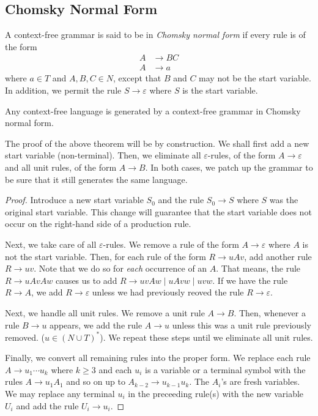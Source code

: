 \subsection{Chomsky Normal Form}
\begin{definition}
    A context-free grammar is said to be in \textit{Chomsky normal form} if every rule is of the form 
    \begin{align*}
        A &\rightarrow BC\\
        A &\rightarrow a
    \end{align*}
    where $a\in T$ and $A,B,C\in N$, except that $B$ and $C$ may not be the start variable. In addition, we permit the rule $S\rightarrow\varepsilon$ where $S$ is the start variable.
\end{definition}

\begin{theorem}
    Any context-free language is generated by a context-free grammar in Chomsky normal form.
\end{theorem}

The proof of the above theorem will be by construction. We shall first add a new start variable (non-terminal). Then, we eliminate all $\varepsilon$-rules, of the form $A\rightarrow\varepsilon$ and all unit rules, of the form $A\rightarrow B$. In both cases, we patch up the grammar to be sure that it still generates the same language.

\begin{proof}
    Introduce a new start variable $S_0$ and the rule $S_0\rightarrow S$ where $S$ was the original start variable. This change will guarantee that the start variable does not occur on the right-hand side of a production rule.

    Next, we take care of all $\varepsilon$-rules. We remove a rule of the form $A\rightarrow\varepsilon$ where $A$ is not the start variable. Then, for each rule of the form $R\rightarrow uAv$, add another rule $R\rightarrow uv$. Note that we do so for \textit{each} occurrence of an $A$. That means, the rule $R\rightarrow uAvAw$ causes us to add $R\rightarrow uvAw\mid uAvw\mid uvw$. If we have the rule $R\rightarrow A$, we add $R\rightarrow\varepsilon$ unless we had previously reoved the rule $R\rightarrow\varepsilon$.

    Next, we handle all unit rules. We remove a unit rule $A\rightarrow B$. Then, whenever a rule $B\rightarrow u$ appears, we add the rule $A\rightarrow u$ unless this was a unit rule previously removed. ($u\in (N\cup T)^*$). We repeat these steps until we eliminate all unit rules.

    Finally, we convert all remaining rules into the proper form. We replace each rule $A\rightarrow u_1\cdots u_k$ where $k\ge 3$ and each $u_i$ is a variable or a terminal symbol with the rules $A\rightarrow u_1A_1$ and so on up to $A_{k-2}\rightarrow u_{k-1}u_k$. The $A_i$'s are fresh variables. We may replace any terminal $u_i$ in the preceeding rule(s) with the new variable $U_i$ and add the rule $U_i\rightarrow u_i$.
\end{proof}


